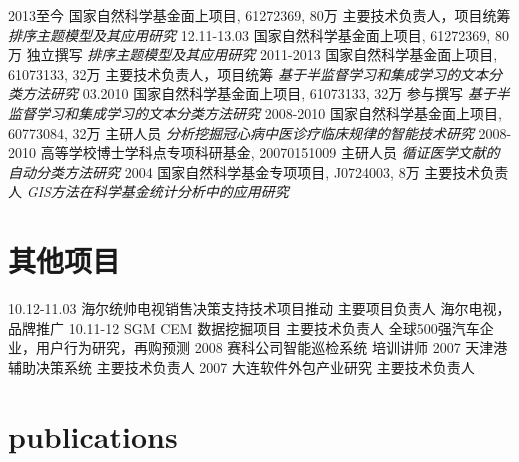 \documentclass[]{friggeri-cv}
\begin{document}
\begin{entrylist}
  \entry
    {2013至今}
    {国家自然科学基金面上项目, 61272369, 80万}
    {主要技术负责人，项目统筹}
    {\emph{排序主题模型及其应用研究}}
  \entry
    {12.11-13.03}
    {国家自然科学基金面上项目, 61272369, 80万}
    {独立撰写}
    {\emph{排序主题模型及其应用研究}}
  \entry
    {2011-2013}
    {国家自然科学基金面上项目, 61073133, 32万}
    {主要技术负责人，项目统筹}
    {\emph{基于半监督学习和集成学习的文本分类方法研究}}
  \entry
    {03.2010}
    {国家自然科学基金面上项目, 61073133, 32万}
    {参与撰写}
    {\emph{基于半监督学习和集成学习的文本分类方法研究}}
  \entry
    {2008-2010}
    {国家自然科学基金面上项目, 60773084, 32万}
    {主研人员}
    {\emph{分析挖掘冠心病中医诊疗临床规律的智能技术研究}}
  \entry
    {2008-2010}
    {高等学校博士学科点专项科研基金, 20070151009}
    {主研人员}
    {\emph{循证医学文献的自动分类方法研究}}
  \entry
    {2004}
    {国家自然科学基金专项项目, J0724003, 8万}
    {主要技术负责人}
    {\emph{GIS方法在科学基金统计分析中的应用研究}}
\end{entrylist}

\section{其他项目}

\begin{entrylist}
  \entry
    {10.12-11.03}
    {海尔统帅电视销售决策支持技术项目推动}
    {主要项目负责人}
    {海尔电视，品牌推广}
  \entry
    {10.11-12}
    {SGM CEM 数据挖掘项目}
    {主要技术负责人}
    {全球500强汽车企业，用户行为研究，再购预测}
  \entry
    {2008}
    {赛科公司智能巡检系统}
    {培训讲师}
    {}
  \entry
    {2007}
    {天津港辅助决策系统}
    {主要技术负责人}
    {}
  \entry
    {2007}
    {大连软件外包产业研究}
    {主要技术负责人}
    {}

\end{entrylist}

\section{publications}


\begin{refsection}
  \nocite{*}
  \printbibliography[sorting=chronological, type=inproceedings, title={international peer-reviewed conferences/proceedings}, notkeyword={france}, heading=subbibliography]
\end{refsection}
\begin{refsection}
  \nocite{*}
  \printbibliography[sorting=chronological, type=inproceedings, title={local peer-reviewed conferences/proceedings}, keyword={france}, heading=subbibliography]
\end{refsection}
\end{document}
